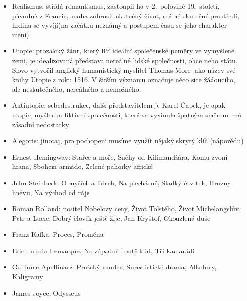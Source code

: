 \documentclass{article}
\begin{document}
\begin{itemize}
    \item Realismus: střídá romantismus, zastoupil ho v 2.~polovině 19.~století, původně z Francie, snaha 
    zobrazit skutečný život, reálné skutečné prostředí, hrdina se vyvíjí(na začátku neznámý a postupem času
    se jeho charakter mění)
    
    \item Utopie: prozaický žánr, který líčí ideální společenské poměry ve vymyšlené zemi, je idealizovaná 
    představa nereálné lidské společnosti, obce nebo státu. Slovo vytvořil anglický humanistický myslitel 
    Thomas More jako název své knihy Utopie z roku 1516. V širším významu označuje něco sice žádoucího, ale 
    neskutečného, nereálného a nemožného.
    
    \item Antiutopie: sebedestrukce, další představitelem je Karel Čapek, je opak utopie, myšlenka fiktivní 
    společnosti, která se vyvinula špatným směrem, má zásadní nedostatky
    
    \item Alegorie: jinotaj, pro pochopení musíme využít nějaký skrytý klíč (nápovědu)
    \item Ernest Hemingway: Stařec a moře, Sněhy od Kilimandžára, Komu zvoní hrana, Sbohem armádo, Zelené 
    pahorky africké			
    
    \item John Steinbeck: O myších a lidech, Na plechárně, Sladký čtvrtek, Hrozny hněvu, Na východ od ráje
    \item Roman Rolland: nositel Nobelovy ceny, Život Tolstého, Život Michelangelův, Petr a Lucie, Dobrý 
    člověk ještě žije, Jan Kryštof, Okouzlená duše
    
    \item Franz Kafka: Proces, Proměna
    \item Erich maria Remarque: Na západní frontě klid, Tři kamarádi
    \item Guillame Apollinare: Pražský chodec, Surealistické drama, Alkoholy, Kaligramy
    \item James Joyce: Odysseus
\end{itemize}
\end{document}
